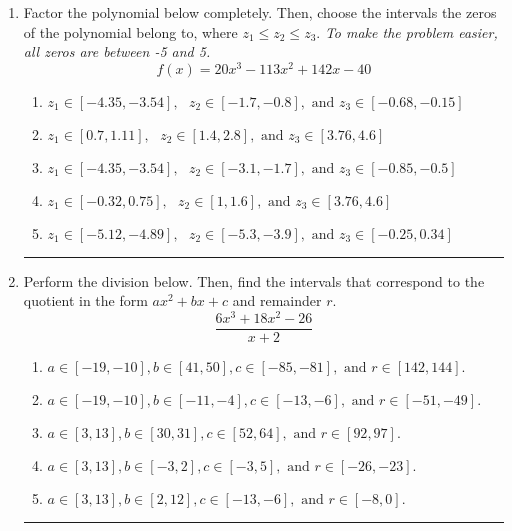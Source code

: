 \documentclass[14pt]{extbook}
\newcommand{\litem}[1]{\item#1\hspace*{-1cm}\rule{\textwidth}{0.4pt}}
\begin{document}
\begin{enumerate}
{\begin{enumerate}[label=\Alph*.]
\end{enumerate} }
\litem{
Factor the polynomial below completely. Then, choose the intervals the zeros of the polynomial belong to, where $z_1 \leq z_2 \leq z_3$. \textit{To make the problem easier, all zeros are between -5 and 5.}\[ f(x) = 20x^{3} -113 x^{2} +142 x -40 \]\begin{enumerate}[label=\Alph*.]
\item \( z_1 \in [-4.35, -3.54], \text{   }  z_2 \in [-1.7, -0.8], \text{   and   } z_3 \in [-0.68, -0.15] \)
\item \( z_1 \in [0.7, 1.11], \text{   }  z_2 \in [1.4, 2.8], \text{   and   } z_3 \in [3.76, 4.6] \)
\item \( z_1 \in [-4.35, -3.54], \text{   }  z_2 \in [-3.1, -1.7], \text{   and   } z_3 \in [-0.85, -0.5] \)
\item \( z_1 \in [-0.32, 0.75], \text{   }  z_2 \in [1, 1.6], \text{   and   } z_3 \in [3.76, 4.6] \)
\item \( z_1 \in [-5.12, -4.89], \text{   }  z_2 \in [-5.3, -3.9], \text{   and   } z_3 \in [-0.25, 0.34] \)

\end{enumerate} }
\litem{
Perform the division below. Then, find the intervals that correspond to the quotient in the form $ax^2+bx+c$ and remainder $r$.\[ \frac{6x^{3} +18 x^{2} -26}{x + 2} \]\begin{enumerate}[label=\Alph*.]
\item \( a \in [-19, -10], b \in [41, 50], c \in [-85, -81], \text{ and } r \in [142, 144]. \)
\item \( a \in [-19, -10], b \in [-11, -4], c \in [-13, -6], \text{ and } r \in [-51, -49]. \)
\item \( a \in [3, 13], b \in [30, 31], c \in [52, 64], \text{ and } r \in [92, 97]. \)
\item \( a \in [3, 13], b \in [-3, 2], c \in [-3, 5], \text{ and } r \in [-26, -23]. \)
\item \( a \in [3, 13], b \in [2, 12], c \in [-13, -6], \text{ and } r \in [-8, 0]. \)


\end{enumerate}}
\end{enumerate}
\end{document}
